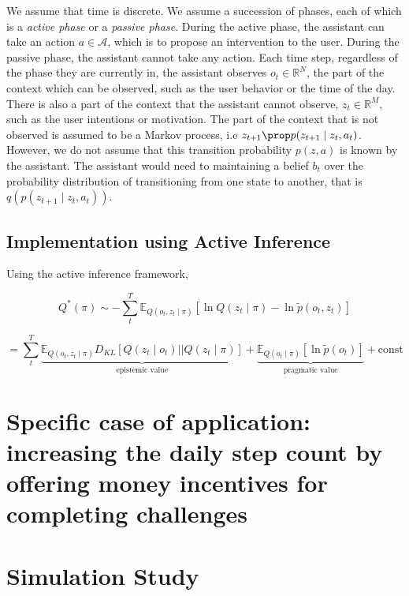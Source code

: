 \documentclass[manuscript,screen,review]{acmart}
\begin{document}
We assume that time is discrete. We assume a succession of phases, each of which is a \textit{active phase} or a
\textit{passive phase}. During the active phase, the assistant can take an action $a \in \mathcal{A}$, which is to
propose an intervention to the user. During the passive phase, the assistant cannot take any action.
Each time step, regardless of the phase they are currently in, the assistant observes $o_t \in \mathbb{R}^N$,
the part of the context which can be observed, such as the user behavior or the time of the day. There is also a part
 of the context that the assistant cannot observe,
$z_t \in \mathbb{R}^M$, such as the user intentions or motivation. The part of the context that is not observed is
assumed to be a Markov process, i.e $z_{t+1} \prop p(z_{t+1} \mid z_t, a_t)$. However, we do not assume that this
transition
probability
$p(z, a)$ is known by the assistant. The assistant would need to maintaining a belief $b_t$ over the probability
distribution of transitioning from one state to another, that is $q(p(z_{t+1} \mid z_t, a_t))$.



\subsection{Implementation using Active Inference}

Using the active inference framework,

\begin{equation}
Q^*(\pi) \sim - \sum_{t}^{T} \mathbb E_{Q(o_t, z_t \mid \pi)} \left[\ln Q(z_t \mid \pi) - \ln \tilde p(o_t, z_t) \right]
\end{equation}

\begin{equation}
    = \sum_{t}^{T}  \underbrace{ \mathbb E_{Q(o_t, z_t \mid \pi)} D_{KL}\left[ Q(z_t \mid o_t) || Q(z_t \mid \pi) \right] }_{ \text{epistemic value} }
    + \underbrace{ \mathbb E_{Q(o_t \mid \pi) } \left[ \ln \tilde p(o_t) \right]}_{ \text{pragmatic value} } + \text{const}
\end{equation}

\section{Specific case of application: increasing the daily step count by offering money incentives for completing
challenges}





\section{Simulation Study}
\end{document}
